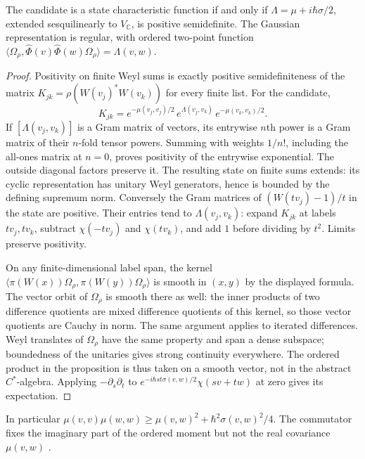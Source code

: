 \begin{proposition}\label{f:gaussian-positivity}
The candidate is a state characteristic function if and only if $\Lambda=\mu+i\hbar\sigma/2$, extended sesquilinearly to $V_{\mathbb C}$, is positive semidefinite. The Gaussian representation is regular, with ordered two-point function $\langle\Omega_\rho,\widehat\Phi(v)\widehat\Phi(w)\Omega_\rho\rangle=\Lambda(v,w)$.
\end{proposition}
\begin{proof}
Positivity on finite Weyl sums is exactly positive semidefiniteness of the matrix $K_{jk}=\rho(W(v_j)^*W(v_k))$ for every finite list. For the candidate,
\[
 K_{jk}=e^{-\mu(v_j,v_j)/2}\,e^{\Lambda(v_j,v_k)}\,e^{-\mu(v_k,v_k)/2} .
\]
If $[\Lambda(v_j,v_k)]$ is a Gram matrix of vectors, its entrywise $n$th power is a Gram matrix of their $n$-fold tensor powers. Summing with weights $1/n!$, including the all-ones matrix at $n=0$, proves positivity of the entrywise exponential. The outside diagonal factors preserve it. The resulting state on finite sums extends: its cyclic representation has unitary Weyl generators, hence is bounded by the defining supremum norm. Conversely the Gram matrices of $(W(tv_j)-1)/t$ in the state are positive. Their entries tend to $\Lambda(v_j,v_k)$: expand $K_{jk}$ at labels $tv_j,tv_k$, subtract $\chi(-tv_j)$ and $\chi(tv_k)$, and add $1$ before dividing by $t^2$. Limits preserve positivity.

On any finite-dimensional label span, the kernel $\langle\pi(W(x))\Omega_\rho,\pi(W(y))\Omega_\rho\rangle$ is smooth in $(x,y)$ by the displayed formula. The vector orbit of $\Omega_\rho$ is smooth there as well: the inner products of two difference quotients are mixed difference quotients of this kernel, so those vector quotients are Cauchy in norm. The same argument applies to iterated differences. Weyl translates of $\Omega_\rho$ have the same property and span a dense subspace; boundedness of the unitaries gives strong continuity everywhere. The ordered product in the proposition is thus taken on a smooth vector, not in the abstract $C^*$-algebra. Applying $-\partial_s\partial_t$ to $e^{-i\hbar st\sigma(v,w)/2}\chi(sv+tw)$ at zero gives its expectation.
\end{proof}
In particular $\mu(v,v)\mu(w,w)\ge\mu(v,w)^2+\hbar^2\sigma(v,w)^2/4$. The commutator fixes the imaginary part of the ordered moment but not the real covariance $\mu(v,w)$ \cite{WaldQFT}.

